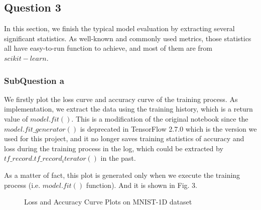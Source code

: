\documentclass[conference]{IEEEtran}
\begin{document}
	
	
	
	\subsection{Question 3}
	
	In this section, we finish the typical model evaluation by extracting several significant statistics. As well-known and commonly used metrics, those statistics all have easy-to-run function to achieve, and most of them are from $scikit-learn$.
	
	\subsubsection{SubQuestion a}
	
	We firstly plot the loss curve and accuracy curve of the training process. As implementation, we extract the data using the training history, which is a return value of $model.fit()$. This is a modification of the original notebook since the $model.fit\_generator()$ is deprecated in TensorFlow 2.7.0 which is the version we used for this project, and it no longer saves training statistics of accuracy and loss during the training process in the log, which could be extracted by $tf\_record.tf\_record_iterator()$ in the past.\par
	As a matter of fact, this plot is generated only when we execute the training process (i.e. $model.fit()$ function). And it is shown in Fig. 3.
	
	\begin{figure}[h]
		\centering  %
		
		\caption{Loss and Accuracy Curve Plots on MNIST-1D dataset}
		\label{Fig.la}
	\end{figure}
	
\end{document}
